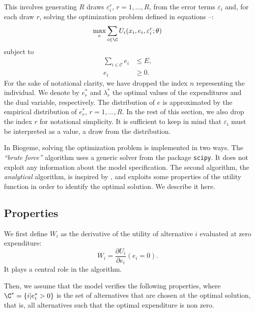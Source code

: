 \documentclass[12pt,a4paper]{article}
\begin{document}
This involves generating $R$ draws $\varepsilon^r_i$, $r=1, \ldots, R$, from the error terms $\varepsilon_{i}$ and, for each draw $r$, solving the
optimization problem defined in equations --:
\[
\max_{e} \sum_{i \in \C} U_{i}(x_{i}, e_{i}, \varepsilon^r_i; \theta)
\]
subject to
\begin{align*}
  \sum_{i \in \mathcal{C}} e_{i} &\leq E,\\
 e_{i} &\geq 0.
\end{align*}
For the sake of notational clarity, we have dropped the index $n$ representing the individual. We denote by $e_r^*$ and $\lambda_r^*$
the optimal values of the expenditures and the dual variable, respectively. The distribution of $e$ is approximated by the empirical distribution
of $e_r^*$, $r=1, \ldots, R$. In the rest of this section, we also drop the index $r$ for notational simplicity.
It is sufficient to keep in mind that $\varepsilon_i$ must be interpreted as a value, a draw from the distribution.

In Biogeme, solving the optimization problem is implemented in two ways. The \emph{``brute force''} algorithm
    uses a generic solver from the package \texttt{scipy}. It does not exploit any information about the model specification.
The second algorithm, the \emph{analytical} algorithm, is inspired by  , and exploits some properties of the
utility function in order to identify the optimal solution. We describe it here.

\subsection{Properties}
We first define $W_i$ as the
derivative of the utility of alternative $i$ evaluated at zero expenditure:
\begin{equation}
    W_i = \frac{\partial U_i}{\partial e_i}(e_i = 0).
\end{equation}
It plays a central role in the algorithm.

Then, we assume that the model verifies
the following properties, where $\C^* = \{i | e_i^* > 0 \}$ is the set of alternatives that are chosen at the optimal
solution, that is, all alternatives such that the optimal expenditure is non zero.
\end{document}
